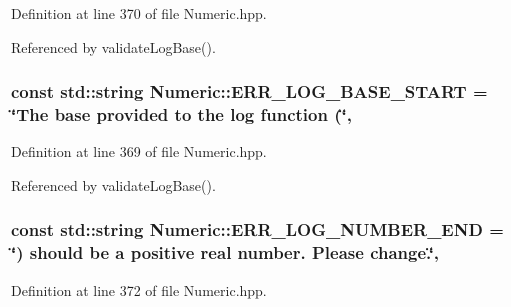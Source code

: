 Definition at line 370 of file Numeric.\-hpp.



Referenced by validate\-Log\-Base().

\hypertarget{classmultiscale_1_1Numeric_a551052e6be615efea82ea046ba178010}{
\subsubsection[{E\-R\-R\-\_\-\-L\-O\-G\-\_\-\-B\-A\-S\-E\-\_\-\-S\-T\-A\-R\-T}]{\setlength{\rightskip}{0pt plus 5cm}const std\-::string Numeric\-::\-E\-R\-R\-\_\-\-L\-O\-G\-\_\-\-B\-A\-S\-E\-\_\-\-S\-T\-A\-R\-T = \char`\"{}The base provided to the {\bf log} function (\char`\"{}\hspace{0.3cm}{\ttfamily [static]}, {\ttfamily [private]}}}\label{classmultiscale_1_1Numeric_a551052e6be615efea82ea046ba178010}


Definition at line 369 of file Numeric.\-hpp.



Referenced by validate\-Log\-Base().

\hypertarget{classmultiscale_1_1Numeric_a2f61b82d42049e175a8d34cd75966c6c}{
\subsubsection[{E\-R\-R\-\_\-\-L\-O\-G\-\_\-\-N\-U\-M\-B\-E\-R\-\_\-\-E\-N\-D}]{\setlength{\rightskip}{0pt plus 5cm}const std\-::string Numeric\-::\-E\-R\-R\-\_\-\-L\-O\-G\-\_\-\-N\-U\-M\-B\-E\-R\-\_\-\-E\-N\-D = \char`\"{}) should be a positive real number. Please change.\char`\"{}\hspace{0.3cm}{\ttfamily [static]}, {\ttfamily [private]}}}\label{classmultiscale_1_1Numeric_a2f61b82d42049e175a8d34cd75966c6c}


Definition at line 372 of file Numeric.\-hpp.



